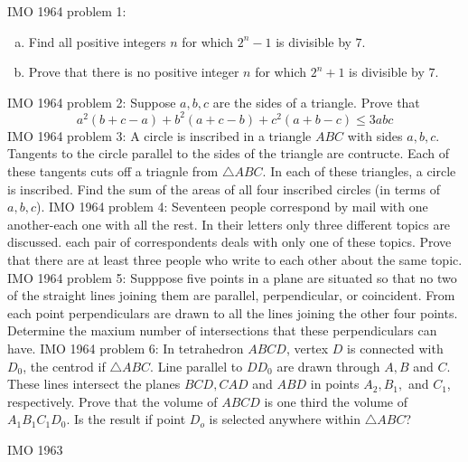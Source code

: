 IMO 1964 problem 1:  \begin{enumerate}[(a)]
  \item Find all positive integers $ n$ for which $ 2^n-1$ is divisible by $ 7$.
  \item Prove that there is no positive integer $ n$ for which $ 2^n+1$ is divisible by $ 7$.
\end{enumerate} 
IMO 1964 problem 2:  Suppose $a,b,c$ are the sides of a triangle. Prove that
\[ a^2(b+c-a)+b^2(a+c-b)+c^2(a+b-c) \leq 3abc \] 
IMO 1964 problem 3:  A circle is inscribed in a triangle $ABC$ with sides $a,b,c$. Tangents to the circle parallel to the sides of the triangle are contructe. Each of these tangents cuts off a triagnle from $\triangle ABC$. In each of these triangles, a circle is inscribed. Find the sum of the areas of all four inscribed circles (in terms of $a,b,c$). 
IMO 1964 problem 4:  Seventeen people correspond by mail with one another-each one with all the rest. In their letters only three different topics are discussed. each pair of correspondents deals with only one of these topics. Prove that there are at least three people who write to each other about the same topic. 
IMO 1964 problem 5:  Supppose five points in a plane are situated so that no two of the straight lines joining them are parallel, perpendicular, or coincident. From each point perpendiculars are drawn to all the lines joining the other four points. Determine the maxium number of intersections that these perpendiculars can have. 
IMO 1964 problem 6:  In tetrahedron $ABCD$, vertex $D$ is connected with $D_0$, the centrod if $\triangle ABC$. Line parallel to $DD_0$ are drawn through $A,B$ and $C$. These lines intersect the planes $BCD, CAD$ and $ABD$ in points $A_2, B_1,$ and $C_1$, respectively. Prove that the volume of $ABCD$ is one third the volume of $A_1B_1C_1D_0$. Is the result if point $D_o$ is selected anywhere within $\triangle ABC$? 

IMO 1963 

